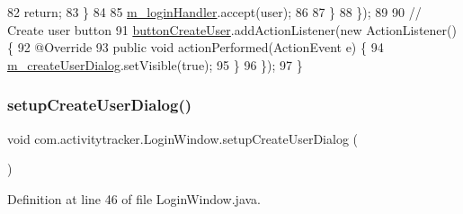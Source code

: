 \begin{DoxyCode}
82                     \textcolor{keywordflow}{return};
83                 \}
84 
85                 \mbox{\hyperlink{classcom_1_1activitytracker_1_1_login_window_a9b7d3aa9c6a7cf67e78606c24e21109c}{m\_loginHandler}}.accept(user);
86 
87             \}
88         \});
89 
90         \textcolor{comment}{// Create user button}
91         \mbox{\hyperlink{classcom_1_1activitytracker_1_1_login_window_a1ff77d6846d01d4a8540371ede091371}{buttonCreateUser}}.addActionListener(\textcolor{keyword}{new} ActionListener() \{
92             @Override
93             \textcolor{keyword}{public} \textcolor{keywordtype}{void} actionPerformed(ActionEvent e) \{
94                 \mbox{\hyperlink{classcom_1_1activitytracker_1_1_login_window_a49ff7093e29ce7bd22c42ac8099d5d34}{m\_createUserDialog}}.setVisible(\textcolor{keyword}{true});
95             \}
96         \});
97     \}
\end{DoxyCode}
\mbox{\label{classcom_1_1activitytracker_1_1_login_window_a567db7b15448fe9d9c76addbcee4092b}} 
\subsubsection{\texorpdfstring{setup\+Create\+User\+Dialog()}{setupCreateUserDialog()}}
{\footnotesize\ttfamily void com.\+activitytracker.\+Login\+Window.\+setup\+Create\+User\+Dialog (\begin{DoxyParamCaption}{ }\end{DoxyParamCaption})\hspace{0.3cm}{\ttfamily [private]}}



Definition at line 46 of file Login\+Window.\+java.


